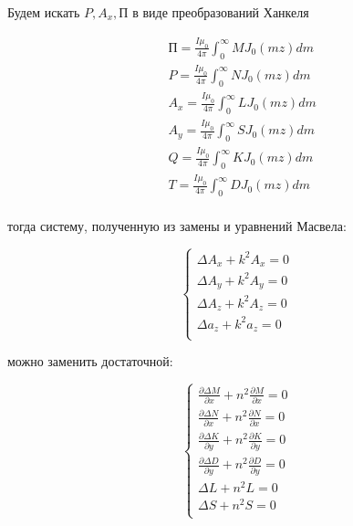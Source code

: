 	Будем искать $P, A_x, \text{П}$ в виде преобразований Ханкеля
	
	\begin{equation}
		\begin{aligned}
			& \text{П} = \frac{I \mu_0}{4 \pi} \int_0^{\infty} M J_0(mz) dm \\
			& P = \frac{I \mu_0}{4 \pi} \int_0^{\infty} N J_0(mz) dm \\
			& A_x = \frac{I \mu_0}{4 \pi} \int_0^{\infty} L J_0(mz) dm \\
			& A_y = \frac{I \mu_0}{4 \pi} \int_0^{\infty} S J_0(mz) dm \\
			& Q = \frac{I \mu_0}{4 \pi} \int_0^{\infty} K J_0(mz) dm \\
			& T = \frac{I \mu_0}{4 \pi} \int_0^{\infty} D J_0(mz) dm \\
		\end{aligned}
	\end{equation} 
	
	тогда систему, полученную из замены и уравнений Масвела:
	
	\begin{equation}
		\begin{cases}
			\Delta A_x + k^2 A_x = 0 \\
			\Delta A_y + k^2 A_y = 0 \\
			\Delta A_z + k^2 A_z = 0 \\
			\Delta a_z + k^2 a_z = 0 \\
		\end{cases}
	\end{equation}
	
	можно заменить достаточной:
	
	\begin{equation}
		\begin{cases}
			\frac{\partial \Delta M}{\partial x} + n^2 \frac{\partial M}{\partial x} = 0 \\
			\frac{\partial \Delta N}{\partial x} + n^2 \frac{\partial N}{\partial x} = 0 \\
			\frac{\partial \Delta K}{\partial y} + n^2 \frac{\partial K}{\partial y} = 0 \\
			\frac{\partial \Delta D}{\partial y} + n^2 \frac{\partial D}{\partial y} = 0 \\
			\Delta L + n^2 L = 0 \\
			\Delta S + n^2 S = 0 \\
		\end{cases}
	\end{equation}
	
